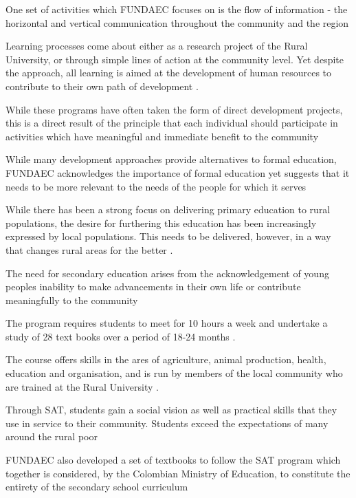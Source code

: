 One set of activities which FUNDAEC focuses on is the flow of information - the horizontal and vertical communication throughout the community and the region \citep{Arbab1988}

Learning processes come about either as a research project of the Rural University, or through simple lines of action at the community level. Yet despite the approach, all learning is aimed at the development of human resources to contribute to their own path of development \citep{Arbab1988}. %

While these programs have often taken the form of direct development projects, this is a direct result of the principle that each individual should participate in activities which have meaningful and immediate benefit to the community \citep{Arbab1988}

While many development approaches provide alternatives to formal education, FUNDAEC acknowledges the importance of formal education yet suggests that it needs to be more relevant to the needs of the people for which it serves \citep{Arbab1988}

While there has been a strong focus on delivering primary education to rural populations, the desire for furthering this education has been increasingly expressed by local populations. This needs to be delivered, however, in a way that changes rural areas for the better \citep{Arbab1988}.

The need for secondary education arises from the acknowledgement of young peoples inability to make advancements in their own life or contribute meaningfully to the community \citep{Arbab1988}

The program requires students to meet for 10 hours a week and undertake a study of 28 text books over a period of 18-24 months \citep{Arbab1988}.

The course offers skills in the ares of agriculture, animal production, health, education and organisation, and is run by members of the local community who are trained at the Rural University \citep{Arbab1988}.

Through SAT, students gain a social vision as well as practical skills that they use in service to their community. Students exceed the expectations of many around the rural poor \citep{Arbab1988}

FUNDAEC also developed a set of textbooks to follow the SAT program which together is considered, by the Colombian Ministry of Education, to constitute the entirety of the secondary school curriculum \citep{Arbab1988}

